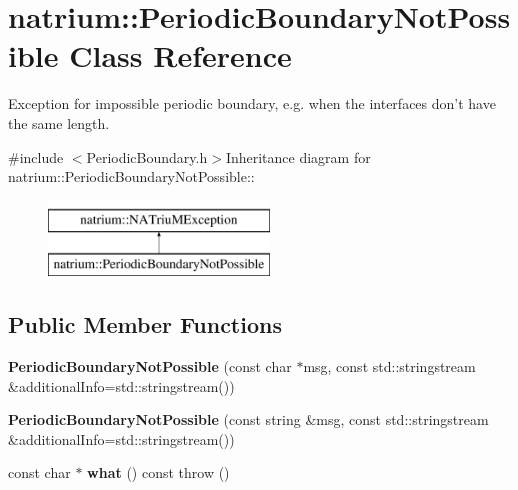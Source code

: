 \hypertarget{classnatrium_1_1PeriodicBoundaryNotPossible}{
\section{natrium::PeriodicBoundaryNotPossible Class Reference}
\label{classnatrium_1_1PeriodicBoundaryNotPossible}
}


Exception for impossible periodic boundary, e.g. when the interfaces don't have the same length.  


{\ttfamily \#include $<$PeriodicBoundary.h$>$}Inheritance diagram for natrium::PeriodicBoundaryNotPossible::\begin{figure}[H]
\begin{center}
\leavevmode
\includegraphics[height=2cm]{classnatrium_1_1PeriodicBoundaryNotPossible}
\end{center}
\end{figure}
\subsection*{Public Member Functions}
\begin{DoxyCompactItemize}
\item 
\hypertarget{classnatrium_1_1PeriodicBoundaryNotPossible_ad5eb4588e496d08cea9b623df1372807}{
{\bfseries PeriodicBoundaryNotPossible} (const char $\ast$msg, const std::stringstream \&additionalInfo=std::stringstream())}
\label{classnatrium_1_1PeriodicBoundaryNotPossible_ad5eb4588e496d08cea9b623df1372807}

\item 
\hypertarget{classnatrium_1_1PeriodicBoundaryNotPossible_a4597b7a3a3e34233911fe8e1dd7bc5f4}{
{\bfseries PeriodicBoundaryNotPossible} (const string \&msg, const std::stringstream \&additionalInfo=std::stringstream())}
\label{classnatrium_1_1PeriodicBoundaryNotPossible_a4597b7a3a3e34233911fe8e1dd7bc5f4}

\item 
\hypertarget{classnatrium_1_1PeriodicBoundaryNotPossible_a32746bddb45dc92e28e8aef98ceed310}{
const char $\ast$ {\bfseries what} () const   throw ()}
\label{classnatrium_1_1PeriodicBoundaryNotPossible_a32746bddb45dc92e28e8aef98ceed310}

\end{DoxyCompactItemize}


